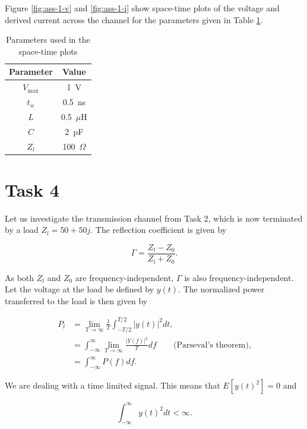 \documentclass[11pt,titlepage]{report}
\begin{document}
Figure \ref{fig:ass-1-v} and \ref{fig:ass-1-i} show space-time plots of the voltage and derived current across the channel for the parameters given in Table \ref{tab:ass-1-parms}.

\begin{table}[H]
	\centering
	\caption{Parameters used in the space-time plots}
	\label{tab:ass-1-parms}
	\begin{tabular}{c c}
		\hline\hline
		Parameter & Value \\
		\hline
		$V_{\text{max}}$ & \SI{1}{V} \\
		$t_w$ & \SI{0.5}{ns} \\
		$L$ & \SI{0.5}{$\mu$H} \\
		$C$ & \SI{2}{pF} \\
		$Z_l$ & \SI{100}{$\Omega$} \\
		\hline
	\end{tabular}
\end{table}

\section{Task 4}
Let us investigate the transmission channel from Task 2, which is now terminated by a load $Z_l=50+50j$. The reflection coefficient is given by

\begin{equation}
	\Gamma = \frac{Z_l - Z_0}{Z_l + Z_0}.
\end{equation}

As both $Z_l$ and $Z_0$ are frequency-independent, $\Gamma$ is also frequency-independent. Let the voltage at the load be defined by $y(t)$. The normalized power transferred to the load is then given by

\begin{align}
	P_l &= \lim_{T \to \infty} \frac{1}{T} \int_{-T/2}^{T/2} |y(t)|^2 dt, \label{eq:ass-1-esd-lim} \\
	&= \int_{-\infty}^{\infty} \lim_{T \to \infty} \frac{|Y(f)|^2}{T} df \quad \quad \text{(Parseval's theorem),} \nonumber \\
	&= \int_{-\infty}^{\infty} P(f) df.
\end{align}

We are dealing with a time limited signal. This means that $E[y(t)^2]=0$ and 

\begin{equation}
	\int_{-\infty}^{\infty} y(t)^2 dt < \infty.
\end{equation}
\end{document}
